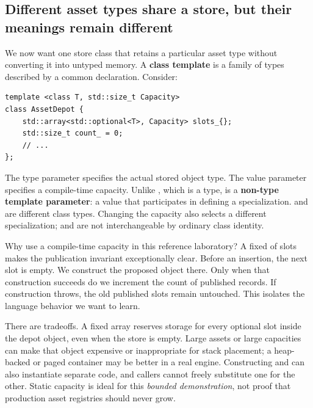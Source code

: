 \subsection{Different asset types share a store, but their meanings remain different}\label{05-engine-i-ch005-different-asset-types-share-a-store-but-their-meanings-remain-different}

\hypertarget{05-engine-i-ch005-different-asset-types-share-a-store-but-their-meanings-remain-different}{}

We now want one store class that retains a particular asset type without converting it into untyped memory. A \textbf{class template} is a family of types described by a common declaration. Consider:

\begin{verbatim}
template <class T, std::size_t Capacity>
class AssetDepot {
    std::array<std::optional<T>, Capacity> slots_{};
    std::size_t count_ = 0;
    // ...
};
\end{verbatim}

The type parameter  specifies the actual stored object type. The value parameter  specifies a compile-time capacity. Unlike , which is a type,  is a \textbf{non-type template parameter}: a value that participates in defining a specialization.  and  are different class types. Changing the capacity also selects a different specialization;  and  are not interchangeable by ordinary class identity.

Why use a compile-time capacity in this reference laboratory? A fixed  of  slots makes the publication invariant exceptionally clear. Before an insertion, the next slot is empty. We construct the proposed object there. Only when that construction succeeds do we increment the count of published records. If construction throws, the old published slots remain untouched. This isolates the language behavior we want to learn.

There are tradeoffs. A fixed array reserves storage for every optional slot inside the depot object, even when the store is empty. Large assets or large capacities can make that object expensive or inappropriate for stack placement; a heap-backed or paged container may be better in a real engine. Constructing  and  can also instantiate separate code, and callers cannot freely substitute one for the other. Static capacity is ideal for this \emph{bounded demonstration}, not proof that production asset registries should never grow.

